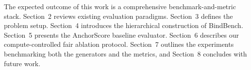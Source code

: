 The expected outcome of this work is a comprehensive benchmark-and-metric stack. Section~2 reviews existing evaluation paradigms. Section~3 defines the problem setup. Section~4 introduces the hierarchical construction of BindBench. Section~5 presents the AnchorScore baseline evaluator. Section~6 describes our compute-controlled fair ablation protocol. Section~7 outlines the experiments benchmarking both the generators and the metrics, and Section~8 concludes with future work.
